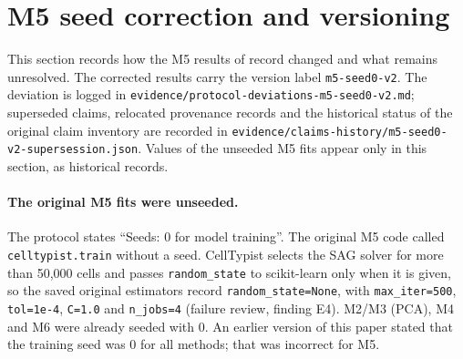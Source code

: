 \documentclass[11pt]{article}
\newcommand{\code}[1]{\texttt{#1}}
\begin{document}
\section{M5 seed correction and versioning}\label{sec:m5}

This section records how the M5 results of record changed and what remains unresolved. The corrected results carry the version label \code{m5-seed0-v2}. The deviation is logged in \nolinkurl{evidence/protocol-deviations-m5-seed0-v2.md}; superseded claims, relocated provenance records and the historical status of the original claim inventory are recorded in \nolinkurl{evidence/claims-history/m5-seed0-v2-supersession.json}. Values of the unseeded M5 fits appear only in this section, as historical records.

\paragraph{The original M5 fits were unseeded.} The protocol states ``Seeds: 0 for model training''. The original M5 code called \code{celltypist.train} without a seed. CellTypist selects the SAG solver for more than 50{,}000 cells and passes \code{random\_state} to scikit-learn only when it is given, so the saved original estimators record \code{random\_state=None}, with \code{max\_iter=500}, \code{tol=1e-4}, \code{C=1.0} and \code{n\_jobs=4} (failure review, finding E4). M2/M3 (PCA), M4 and M6 were already seeded with 0. An earlier version of this paper stated that the training seed was 0 for all methods; that was incorrect for M5.
\end{document}
